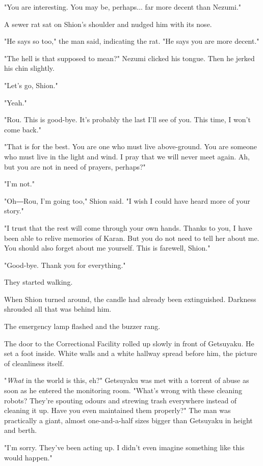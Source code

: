 "You are interesting. You may be, perhaps... far more decent than
Nezumi."

A sewer rat sat on Shion's shoulder and nudged him with its nose.

"He says so too," the man said, indicating the rat. "He says you are
more decent."

"The hell is that supposed to mean?" Nezumi clicked his tongue. Then he
jerked his chin slightly.

"Let's go, Shion."

"Yeah."

"Rou. This is good-bye. It's probably the last I'll see of you. This
time, I won't come back."

"That is for the best. You are one who must live above-ground. You are
someone who must live in the light and wind. I pray that we will never
meet again. Ah, but you are not in need of prayers, perhaps?"

"I'm not."

"Oh―Rou, I'm going too," Shion said. "I wish I could have heard more of
your story."

"I trust that the rest will come through your own hands. Thanks to you,
I have been able to relive memories of Karan. But you do not need to
tell her about me. You should also forget about me yourself. This is
farewell, Shion."

"Good-bye. Thank you for everything."

They started walking.

When Shion turned around, the candle had already been extinguished.
Darkness shrouded all that was behind him.

\mybreak

The emergency lamp flashed and the buzzer rang.

The door to the Correctional Facility rolled up slowly in front of
Getsuyaku. He set a foot inside. White walls and a white hallway spread
before him, the picture of cleanliness itself.

"\emph{What} in the world is this, eh?" Getsuyaku was met with a torrent of
abuse as soon as he entered the monitoring room. "What's wrong with
these cleaning robots? They're spouting odours and strewing trash
everywhere instead of cleaning it up. Have you even maintained them
properly?" The man was practically a giant, almost one-and-a-half sizes
bigger than Getsuyaku in height and berth.

"I'm sorry. They've been acting up. I didn't even imagine something like
this would happen."

